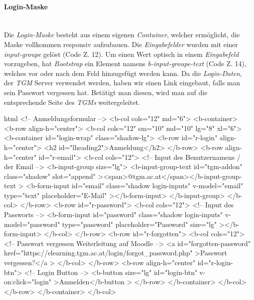 \paragraph{Login-Maske}
~\\
Die \textit{Login-Maske} besteht aus einem eigenen \textit{Container}, welcher ermöglicht, die Maske vollkommen responsiv aufzubauen. Die \textit{Eingabefelder} wurden mit einer \textit{input-groupe} gelöst (Code Z. 12). Um einen Wert optisch in einem \textit{Eingabefeld} vorzugeben, hat \textit{Bootstrap} ein Element namens \textit{b-input-groupe-text} (Code Z. 14), welches vor oder nach dem Feld hinzugefügt werden kann. Da die \textit{Login-Daten}, der \textit{TGM} Server verwendet werden, haben wir einen Link eingebaut, falls man sein Passwort vergessen hat. Betätigt man diesen, wird man auf die entsprechende Seite des \textit{TGMs} weitergeleitet.
\begin{code}{html}
	<!-- Anmeldungsformular -->
	<b-col cols="12" md="6">
		<b-container>
			<b-row align-h="center">
				<b-col cols="12" sm="10" md="10" lg="8" xl="6">
					<b-container id="login-wrap" class="shadow-lg">
						<b-row id="r-login" align-h="center">
							<h2 id="lheading2">Anmeldung</h2>
						</b-row>
						<b-row align-h="center" id="r-email">
							<b-col cols="12">
								<!-- Input des Benutzernamens / der Email -->
								<b-input-group size="lg">
									<b-input-group-text
										id="tgm-addon"
										class="shadow"
										slot="append"
										><span>@tgm.ac.at</span></b-input-group-text
										>
									<b-form-input
										id="email"
										class="shadow login-inputs"
										v-model="email"
										type="text"
										placeholder="E-Mail"
									></b-form-input>
								</b-input-group>
							</b-col>
						</b-row>
						<b-row id="r-password">
							<b-col cols="12">
								<!-- Input des Passworts -->
								<b-form-input
									id="password"
									class="shadow login-inputs"
									v-model="password"
									type="password"
									placeholder="Password"
									size="lg"
								></b-form-input>
							</b-col>
						</b-row>
						<b-row id="r-forgotten">
							<b-col cols="12">
								<!-- Passwort vergessen Weiterleitung auf Moodle -->
								<a
									id="forgotten-password"
									href="https://elearning.tgm.ac.at/login/forgot_password.php"
								>Passwort vergessen?</a
								>
							</b-col>
						</b-row>
						<b-row align-h="center" id="r-login-btn">
							<!-- Login Button -->
							<b-button size="lg" id="login-btn" v-on:click="login"
							>Anmelden</b-button
							>
						</b-row>
					</b-container>
				</b-col>
			</b-row>
		</b-container>
	</b-col>
\end{code}

